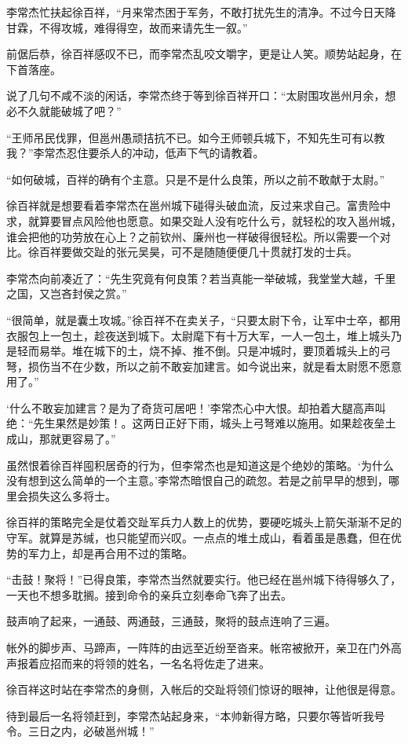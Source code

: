 李常杰忙扶起徐百祥，“月来常杰困于军务，不敢打扰先生的清净。不过今日天降甘霖，不得攻城，难得得空，故而来请先生一叙。”

前倨后恭，徐百祥感叹不已，而李常杰乱咬文嚼字，更是让人笑。顺势站起身，在下首落座。

说了几句不咸不淡的闲话，李常杰终于等到徐百祥开口：“太尉围攻邕州月余，想必不久就能破城了吧？”

“王师吊民伐罪，但邕州愚顽拮抗不已。如今王师顿兵城下，不知先生可有以教我？”李常杰忍住要杀人的冲动，低声下气的请教着。

“如何破城，百祥的确有个主意。只是不是什么良策，所以之前不敢献于太尉。”

徐百祥就是想要看着李常杰在邕州城下碰得头破血流，反过来求自己。富贵险中求，就算要冒点风险他也愿意。如果交趾人没有吃什么亏，就轻松的攻入邕州城，谁会把他的功劳放在心上？之前钦州、廉州也一样破得很轻松。所以需要一个对比。徐百祥要做交趾的张元吴昊，可不是随随便便几十贯就打发的士兵。

李常杰向前凑近了：“先生究竟有何良策？若当真能一举破城，我堂堂大越，千里之国，又岂吝封侯之赏。”

“很简单，就是囊土攻城。”徐百祥不在卖关子，“只要太尉下令，让军中士卒，都用衣服包上一包土，趁夜送到城下。太尉麾下有十万大军，一人一包土，堆上城头乃是轻而易举。堆在城下的土，烧不掉、推不倒。只是冲城时，要顶着城头上的弓弩，损伤当不在少数，所以之前不敢妄加建言。如今说出来，就是看太尉愿不愿意用了。”

‘什么不敢妄加建言？是为了奇货可居吧！’李常杰心中大恨。却拍着大腿高声叫绝：“先生果然是妙策！。这两日正好下雨，城头上弓弩难以施用。如果趁夜垒土成山，那就更容易了。”

虽然恨着徐百祥囤积居奇的行为，但李常杰也是知道这是个绝妙的策略。‘为什么没有想到这么简单的一个主意。’李常杰暗恨自己的疏忽。若是之前早早的想到，哪里会损失这么多将士。

徐百祥的策略完全是仗着交趾军兵力人数上的优势，要硬吃城头上箭矢渐渐不足的守军。就算是苏缄，也只能望而兴叹。一点点的堆土成山，看着虽是愚蠢，但在优势的军力上，却是再合用不过的策略。

“击鼓！聚将！”已得良策，李常杰当然就要实行。他已经在邕州城下待得够久了，一天也不想多耽搁。接到命令的亲兵立刻奉命飞奔了出去。

鼓声响了起来，一通鼓、两通鼓，三通鼓，聚将的鼓点连响了三遍。

帐外的脚步声、马蹄声，一阵阵的由远至近纷至沓来。帐帘被掀开，亲卫在门外高声报着应招而来的将领的姓名，一名名将佐走了进来。

徐百祥这时站在李常杰的身侧，入帐后的交趾将领们惊讶的眼神，让他很是得意。

待到最后一名将领赶到，李常杰站起身来，“本帅新得方略，只要尔等皆听我号令。三日之内，必破邕州城！”

